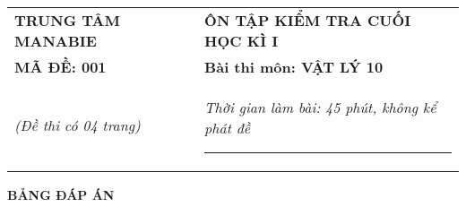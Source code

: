 \begin{center}
	\begin{tabular}{M{9.25cm}M{8.75cm}}
		\textbf{TRUNG TÂM MANABIE}& \textbf{ÔN TẬP KIỂM TRA CUỐI HỌC KÌ I}\\
		\textbf{MÃ ĐỀ: 001}& \textbf{Bài thi môn: VẬT LÝ 10}\\
		\textit{(Đề thi có 04 trang)}& \textit{Thời gian làm bài: 45 phút, không kể phát đề}
		
		\noindent\rule{4cm}{0.8pt} \\
	\end{tabular}
\end{center}
\setcounter{section}{0}
\begin{center}
	\textbf{\large BẢNG ĐÁP ÁN}
\end{center}
\section{}
\section{}
\section{}
